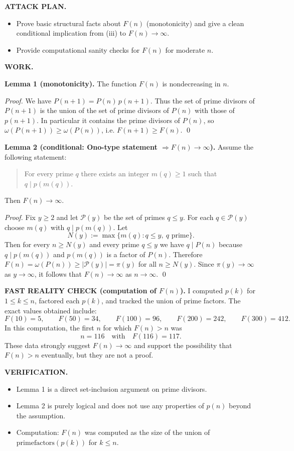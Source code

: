 \medskip
\noindent\textbf{ATTACK PLAN.}
\begin{itemize}
\item Prove basic structural facts about $F(n)$ (monotonicity) and give a clean conditional implication from (iii) to $F(n)\to\infty$.
\item Provide computational sanity checks for $F(n)$ for moderate $n$.
\end{itemize}

\medskip
\noindent\textbf{WORK.}

\medskip
\noindent\textbf{Lemma 1 (monotonicity).}
The function $F(n)$ is nondecreasing in $n$.

\noindent\emph{Proof.}
We have $P(n+1)=P(n)\,p(n+1)$.
Thus the set of prime divisors of $P(n+1)$ is the union of the set of prime divisors of $P(n)$ with those of $p(n+1)$.
In particular it contains the prime divisors of $P(n)$, so $\omega(P(n+1))\ge \omega(P(n))$, i.e. $F(n+1)\ge F(n)$. \qed

\medskip
\noindent\textbf{Lemma 2 (conditional: Ono-type statement $\Rightarrow F(n)\to\infty$).}
Assume the following statement:
\begin{quote}
For every prime $q$ there exists an integer $m(q)\ge 1$ such that $q\mid p(m(q))$.
\end{quote}
Then $F(n)\to\infty$.

\noindent\emph{Proof.}
Fix $y\ge 2$ and let $\mathcal P(y)$ be the set of primes $q\le y$.
For each $q\in\mathcal P(y)$ choose $m(q)$ with $q\mid p(m(q))$.
Let
\[N(y):=\max\{m(q): q\le y,\ q\text{ prime}\}.
\]
Then for every $n\ge N(y)$ and every prime $q\le y$ we have $q\mid P(n)$ because $q\mid p(m(q))$ and $p(m(q))$ is a factor of $P(n)$.
Therefore $F(n)=\omega(P(n))\ge |\mathcal P(y)|=\pi(y)$ for all $n\ge N(y)$.
Since $\pi(y)\to\infty$ as $y\to\infty$, it follows that $F(n)\to\infty$ as $n\to\infty$. \qed

\medskip
\noindent\textbf{FAST REALITY CHECK (computation of $F(n)$).}
I computed $p(k)$ for $1\le k\le n$, factored each $p(k)$, and tracked the union of prime factors.
The exact values obtained include:
\[
F(10)=5,\qquad F(50)=34,\qquad F(100)=96,\qquad F(200)=242,\qquad F(300)=412.
\]
In this computation, the first $n$ for which $F(n)>n$ was
\[n=116\quad\text{with}\quad F(116)=117.
\]
These data strongly suggest $F(n)\to\infty$ and support the possibility that $F(n)>n$ eventually, but they are not a proof.

\medskip
\noindent\textbf{VERIFICATION.}
\begin{itemize}
\item Lemma 1 is a direct set-inclusion argument on prime divisors.
\item Lemma 2 is purely logical and does not use any properties of $p(n)$ beyond the assumption.
\item Computation: $F(n)$ was computed as the size of the union of $\mathrm{primefactors}(p(k))$ for $k\le n$.
\end{itemize}

